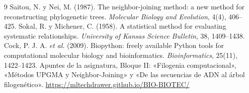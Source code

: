 \documentclass[10pt,a4paper]{article}
\begin{document}
\begin{thebibliography}{9}\footnotesize
{} Saitou, N. y Nei, M. (1987). The neighbor-joining method: a new method for reconstructing phylogenetic trees. \emph{Molecular Biology and Evolution}, 4(4), 406--425.
 Sokal, R. y Michener, C. (1958). A statistical method for evaluating systematic relationships. \emph{University of Kansas Science Bulletin}, 38, 1409--1438.
 Cock, P. J. A. \emph{et al.} (2009). Biopython: freely available Python tools for computational molecular biology and bioinformatics. \emph{Bioinformatics}, 25(11), 1422--1423.
 Apuntes de la asignatura, Bloque II: «Filogenia computacional», «Métodos UPGMA y Neighbor-Joining» y «De las secuencias de ADN al árbol filogenético». \url{https://mltechdrawer.github.io/BIO-BIOTEC/}
\end{thebibliography}
\end{document}
